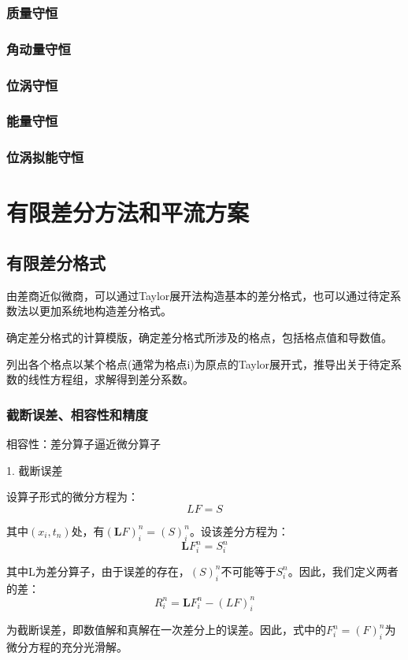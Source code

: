 \documentclass{article}
\begin{document}
\subsubsection{质量守恒}
\subsubsection{角动量守恒}
\subsubsection{位涡守恒}
\subsubsection{能量守恒}
\subsubsection{位涡拟能守恒}

\newpage

\section{有限差分方法和平流方案}
\subsection{有限差分格式}
由差商近似微商，可以通过Taylor展开法构造基本的差分格式，也可以通过待定系数法以更加系统地构造差分格式。

确定差分格式的计算模版，确定差分格式所涉及的格点，包括格点值和导数值。

列出各个格点以某个格点(通常为格点i)为原点的Taylor展开式，推导出关于待定系数的线性方程组，求解得到差分系数。
\subsubsection{截断误差、相容性和精度}
相容性：差分算子逼近微分算子

1. 截断误差

设算子形式的微分方程为：
$$LF = S$$

其中$(x_i, t_n)$处，有$(\mathbf{L}F)_i^n = (S)_i^n$。设该差分方程为：
$$\mathbf{L}F_i^n = S_i^n$$

其中L为差分算子，由于误差的存在，$(S)_i^n$不可能等于$S_i^n$。因此，我们定义两者的差：
$$R_i^n = \mathbf{L}F_i^n-(LF)_i^n$$

为截断误差，即数值解和真解在一次差分上的误差。因此，式中的$F_i^n=(F)_i^n$为微分方程的充分光滑解。
\end{document}
